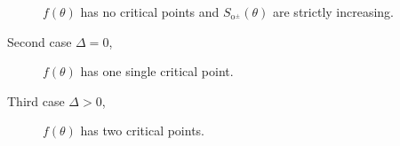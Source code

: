 \documentclass[
    8pt,
    aspectratio=1610,
    c,
    intlimits,
    leqno,
    professionalfonts,
]{beamer}
\begin{document}
\begin{frame}
\begin{description}
		      $f\left(\theta\right)$ has no critical points and
		      $S_{\text{o}^{\pm}}\left(\theta\right)$ are strictly increasing.

		\item[Second case $\Delta=0$,]

		      $f\left(\theta\right)$ has one single critical point.

		\item[Third case $\Delta>0$,]

		      $f\left(\theta\right)$ has two critical points.
	\end{description}
\end{frame}
\end{document}

